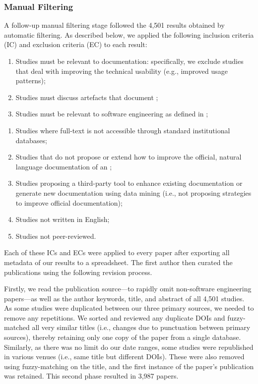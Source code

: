 \subsubsection{Manual Filtering}

A follow-up manual filtering stage followed the 4,501 results obtained by automatic filtering. As described below, we applied the following inclusion criteria (IC) and exclusion criteria (EC) to each result:

\begin{enumerate}[leftmargin=2\parindent,label=\textbf{IC\arabic*}]
  \item Studies must be relevant to  documentation: specifically, we exclude studies that deal with improving the technical  usability (e.g., improved usage patterns);
  \item Studies must discuss artefacts that document ;
  \item Studies must be relevant to software engineering as defined in ;
\end{enumerate}
\begin{enumerate}[leftmargin=2\parindent,label=\textbf{EC\arabic*}]
  \item Studies where full-text is not accessible through standard institutional databases;
  \item Studies that do not propose or extend how to improve the official, natural language documentation of an ;
  \item Studies proposing a third-party tool to enhance existing documentation or generate new documentation using data mining (i.e., not proposing strategies to improve official documentation);
  \item Studies not written in English;
  \item Studies not peer-reviewed.
\end{enumerate}
\smallskip

Each of these ICs and ECs were applied to every paper  after exporting all  metadata of our results to a spreadsheet. The first author then curated the publications using the following revision process.

Firstly, we read the publication source---to rapidly omit non-software engineering papers---as well as the author keywords, title, and abstract of all 4,501 studies. As some studies were duplicated between our three primary sources, we needed to remove any repetitions. We sorted and reviewed any duplicate DOIs and fuzzy-matched all very similar titles (i.e., changes due to punctuation between primary sources), thereby retaining only one copy of the paper from a single database. Similarly, as there was no limit do our date ranges, some studies were republished in various venues (i.e., same title but different DOIs). These were also removed using fuzzy-matching on the title, and the first instance of the paper's publication was retained. This second phase resulted in 3,987 papers.


